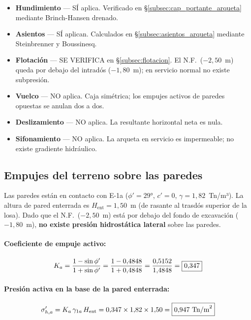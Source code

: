 \begin{itemize}
  \item \textbf{Hundimiento} — SÍ aplica. Verificado en \S\ref{subsec:cap_portante_arqueta}
        mediante Brinch-Hansen drenado.
  \item \textbf{Asientos} — SÍ aplican. Calculados en \S\ref{subsec:asientos_arqueta}
        mediante Steinbrenner y Boussinesq.
  \item \textbf{Flotación} — SE VERIFICA en \S\ref{subsec:flotacion}.
        El N.F.\ ($-2{,}50$~m) queda por debajo del intradós ($-1{,}80$~m);
        en servicio normal no existe subpresión.
  \item \textbf{Vuelco} — NO aplica. Caja simétrica; los empujes activos de
        paredes opuestas se anulan dos a dos.
  \item \textbf{Deslizamiento} — NO aplica. La resultante horizontal neta es nula.
  \item \textbf{Sifonamiento} — NO aplica. La arqueta en servicio es impermeable;
        no existe gradiente hidráulico.
\end{itemize}

\subsection{Empujes del terreno sobre las paredes}
\label{subsec:empujes_arqueta}

Las paredes están en contacto con E-1a ($\phi'=29°$, $c'=0$,
$\gamma=1{,}82$~Tn/m³). La altura de pared enterrada es
$H_\text{ent}=1{,}50$~m (de rasante al trasdós superior de la losa).
Dado que el N.F.\ ($-2{,}50$~m) está por debajo del fondo de excavación
($-1{,}80$~m), \textbf{no existe presión hidrostática lateral} sobre las paredes.

\paragraph{Coeficiente de empuje activo:}
\[
  K_a = \frac{1-\sin\phi'}{1+\sin\phi'}
      = \frac{1-0{,}4848}{1+0{,}4848} = \frac{0{,}5152}{1{,}4848}
      = \boxed{0{,}347}
\]

\paragraph{Presión activa en la base de la pared enterrada:}
\[
  \sigma'_{h,a} = K_a\,\gamma_{1a}\,H_\text{ent}
    = 0{,}347\times1{,}82\times1{,}50 = \boxed{0{,}947~\text{Tn/m}^2}
\]

